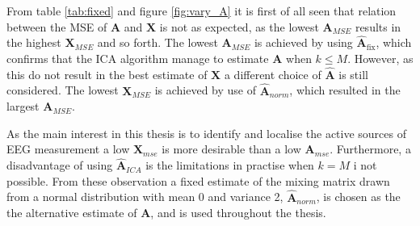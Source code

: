 From table \ref{tab:fixed} and figure \ref{fig:vary_A} it is first of all seen that relation between the MSE of $\textbf{A}$ and $\textbf{X}$ is not as expected, as the lowest $\textbf{A}_{MSE}$ results in the highest $\textbf{X}_{MSE}$ and so forth. The lowest $\textbf{A}_{MSE}$ is achieved by using $\hat{\mathbf{A}}_{\text{fix}}$, which confirms that the ICA algorithm manage to estimate $\textbf{A}$ when $k\leq M$. However, as this do not result in the best estimate of $\textbf{X}$ a different choice of $\hat{\textbf{A}}$ is still considered. The lowest $\textbf{X}_{MSE}$ is achieved by use of $\hat{\textbf{A}}_{norm}$, which resulted in the largest $\textbf{A}_{MSE}$. 
      
As the main interest in this thesis is to identify and localise the active sources of EEG measurement a low $\textbf{X}_{mse}$ is more desirable than a low $\textbf{A}_{mse}$. Furthermore, a disadvantage of using $\hat{\textbf{A}}_{ICA}$ is the limitations in practise when $k=M$ i not possible.     
From these observation a fixed estimate of the mixing matrix drawn from a normal distribution with mean 0 and variance 2, $\hat{\textbf{A}}_{norm}$, is chosen as the the alternative estimate of $\textbf{A}$, and is used throughout the thesis. 


